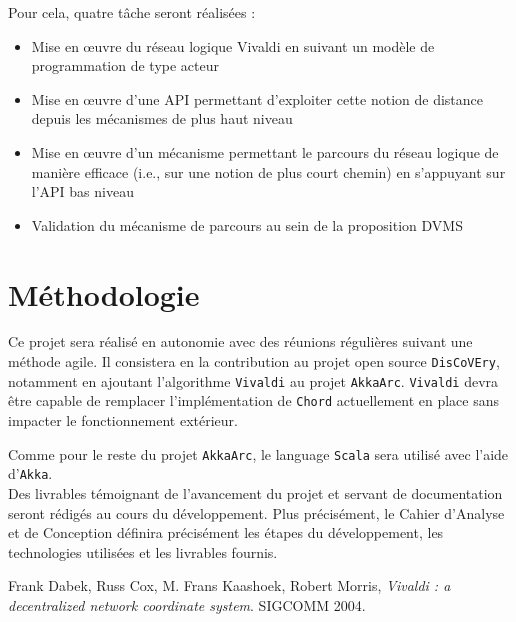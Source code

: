 \documentclass[11pt,a4paper]{article}
\begin{document}
Pour cela, quatre tâche seront réalisées :
\begin{itemize}
\item Mise en \oe uvre du réseau logique Vivaldi en suivant un modèle de programmation de type acteur
\item Mise en \oe uvre d’une API permettant d’exploiter cette notion de distance
depuis les mécanismes de plus haut niveau
\item Mise en \oe uvre d’un mécanisme permettant le parcours du réseau logique de manière efficace (i.e., sur une notion de plus court chemin) en s’appuyant sur l’API bas niveau
\item Validation du mécanisme de parcours au sein de la proposition DVMS
\end{itemize}

\section{Méthodologie}
Ce projet sera réalisé en autonomie avec des réunions régulières suivant une méthode agile. Il consistera en la contribution au projet open source \texttt{DisCoVEry}, notamment en ajoutant l'algorithme \texttt{Vivaldi} au projet \texttt{AkkaArc}. \texttt{Vivaldi} devra être capable de remplacer l'implémentation de \texttt{Chord} actuellement en place sans impacter le fonctionnement extérieur.

Comme pour le reste du projet \texttt{AkkaArc}, le language \texttt{Scala} sera utilisé avec l'aide d'\texttt{Akka}.\\

Des livrables témoignant de l'avancement du projet et servant de documentation seront rédigés au cours du développement.
Plus précisément, le Cahier d'Analyse et de Conception définira précisément les étapes du développement, les technologies utilisées et les livrables fournis.

\begin{thebibliography}{9}

  Frank Dabek, Russ Cox, M. Frans Kaashoek, Robert Morris,
  \emph{Vivaldi : a decentralized network coordinate system}.
  SIGCOMM 2004.

\end{thebibliography}
\end{document}
